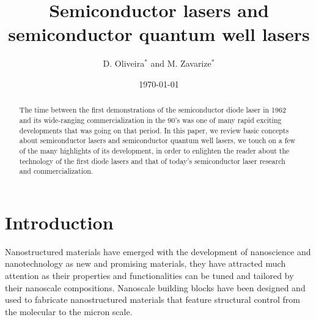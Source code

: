 \documentclass[%
 reprint,
 amsmath,amssymb,
 aps,
]{revtex4-1}
\begin{document}

\title{Semiconductor lasers and semiconductor quantum well lasers }%

\author{D. Oliveira$^*$ and M. Zavarize$^*$}

\date{\today}%

\begin{abstract}
The time between the first demonstrations of the semiconductor diode laser in 1962 and its wide-ranging commercialization in the 90's was one of many rapid exciting developments that was going on that period. In this paper, we review basic concepts about semiconductor lasers and semiconductor quantum well lasers, we touch on a few of the many highlights of its development, in order to enlighten the reader about the technology of the first diode lasers and that of today's semiconductor laser research and commercialization.

\end{abstract}


\maketitle


\section{\label{sec:level1}Introduction}

Nanostructured materials have emerged with the development of nanoscience and nanotechnology as new and promising materials, they have attracted much attention as their properties and functionalities can be tuned and tailored by their nanoscale compositions\cite{russell}. Nanoscale building blocks have been designed and used to fabricate nanostructured materials that feature structural control from the molecular to the micron scale.
\end{document}
